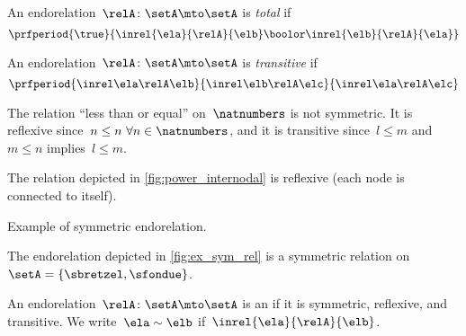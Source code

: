 \begin{ctdefinition}
    \label{def:endo_total}
    An endorelation~$\relA\colon \setA\mto \setA$ is \emph{total} if
    \begin{equation}
        \prfperiod{
            \true
        }{
            \inrel{\ela}{\relA}{\elb} \boolor \inrel{\elb}{\relA}{\ela}
        }
    \end{equation}

\end{ctdefinition}

\begin{ctdefinition}
    \label{def:endo_transitive}
    An endorelation~$\relA\colon \setA\mto \setA$ is \emph{transitive} if
    \begin{equation}
        \prfperiod{
            \inrel \ela \relA \elb
        }{
            \inrel \elb \relA \elc
        }{
            \inrel \ela \relA \elc
        }
    \end{equation}
\end{ctdefinition}

\begin{example}
    The relation ``less than or equal'' on~$\natnumbers$ is not symmetric.
    It is reflexive since~$n\leq n \ \forall n\in \natnumbers$, and it is transitive since~$l\leq m$ and~$m\leq n$ implies~$l\leq m$.
\end{example}

\begin{example}
    The relation depicted in \cref{fig:power_internodal} is reflexive (each node is connected to itself).
\end{example}
\begin{marginfigure}
    \centering
    \caption{Example of symmetric endorelation.}
    \label{fig:ex_sym_rel}
\end{marginfigure}
\begin{example}
    The endorelation depicted in \cref{fig:ex_sym_rel} is a symmetric relation on~$\setA=\{\sbretzel,\sfondue\}$.
\end{example}


\begin{ctdefinition}
    \label{def:equivalence-relation}
    An endorelation~$\relA\colon \setA\mto \setA$ is an \emph{} if it is symmetric, reflexive, and transitive.
    We write~$\ela\sim \elb$ if~$\inrel{\ela}{\relA}{\elb}$.
\end{ctdefinition}

